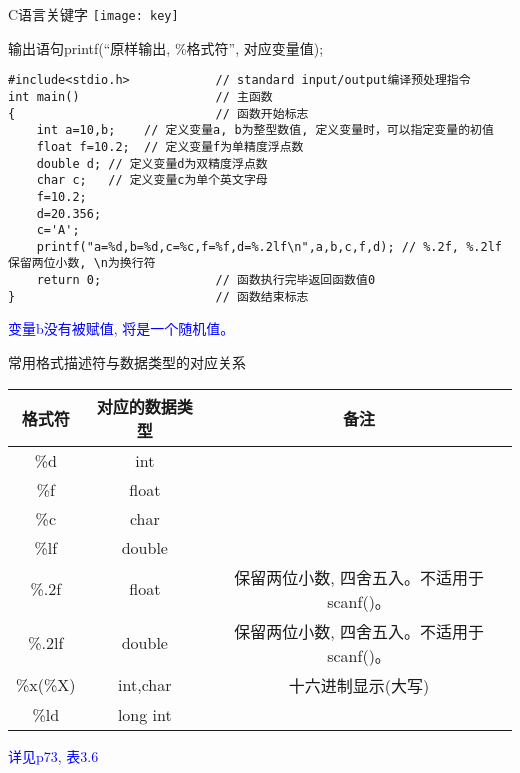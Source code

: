 \begin{frame}{C语言关键字}
\texttt{[image: key]}
\end{frame}

\begin{frame}{输出语句printf(``原样输出, \%格式符'', 对应变量值);}
\begin{lstlisting}
#include<stdio.h>            // standard input/output编译预处理指令
int main()                   // 主函数
{                            // 函数开始标志
	int a=10,b;    // 定义变量a, b为整型数值, 定义变量时，可以指定变量的初值
	float f=10.2;  // 定义变量f为单精度浮点数
	double d; // 定义变量d为双精度浮点数
	char c;   // 定义变量c为单个英文字母
	f=10.2;
	d=20.356;
	c='A';
	printf("a=%d,b=%d,c=%c,f=%f,d=%.2lf\n",a,b,c,f,d); // %.2f, %.2lf保留两位小数, \n为换行符
	return 0;                // 函数执行完毕返回函数值0
}                            // 函数结束标志
\end{lstlisting}
\textcolor{blue}{变量b没有被赋值, 将是一个随机值。}
\end{frame}

\begin{frame}{常用格式描述符与数据类型的对应关系}
\centering
\begin{tabular}{|c|c|c|}
	\hline 
	\textbf{格式符} & \textbf{对应的数据类型} &  \textbf{备注}\\ 
	\hline 
	\%d & int &  \\ 
	\hline  
	\%f & float &  \\
	\hline
	\%c & char & \\ 
	\hline   
	\%lf & double & \\ 
	\hline 
	\%.2f & float & 保留两位小数, 四舍五入。不适用于scanf()。 \\ 
	\hline 
	\%.2lf & double & 保留两位小数, 四舍五入。不适用于scanf()。 \\ 
	\hline   
	\%x(\%X) & int,char & 十六进制显示(大写) \\ 
	\hline 
	\%ld & long int &  \\ 
	\hline 
\end{tabular}
\newline
\newline
\textcolor{blue}{详见p73, 表3.6}
\end{frame}


